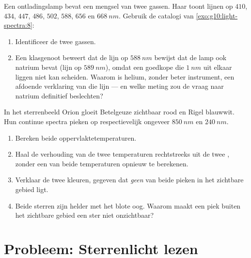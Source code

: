\begin{exercise}[$\star\star\star$]\label{exo:g10:light-spectra:14}
Een ontladingslamp bevat een mengsel van twee gassen. Haar  toont
lijnen op $410$, $434$, $447$, $486$, $502$, $588$, $656$ en
$\qty{668}{nm}$. Gebruik de catalogi van \cref{exo:g10:light-spectra:8}:
\begin{enumerate}
  \item Identificeer de twee gassen.
  \item Een klasgenoot beweert dat de lijn op $\qty{588}{nm}$ bewijst dat
        de lamp ook natrium bevat (lijn op $\qty{589}{nm}$), omdat een
        goedkope   die $\qty{1}{nm}$ uit elkaar
        liggen niet kan scheiden. Waarom is helium, zonder beter
        instrument, een afdoende verklaring van die lijn --- en welke
        meting zou de vraag naar natrium definitief beslechten?
\end{enumerate}
\end{exercise}

\begin{exercise}[$\star\star\star$]\label{exo:g10:light-spectra:15}
In het sterrenbeeld Orion gloeit Betelgeuze zichtbaar rood en Rigel
blauwwit. Hun continue spectra pieken op respectievelijk ongeveer
$\qty{850}{nm}$ en $\qty{240}{nm}$.
\begin{enumerate}
  \item Bereken beide oppervlaktetemperaturen.
  \item Haal de verhouding van de twee temperaturen rechtstreeks uit de
        twee , zonder een van beide temperaturen opnieuw te
        berekenen.
  \item Verklaar de twee kleuren, gegeven dat \emph{geen} van beide
        pieken in het zichtbare gebied ligt.
  \item Beide sterren zijn helder met het blote oog. Waarom maakt een
        piek buiten het zichtbare gebied een ster niet onzichtbaar?
\end{enumerate}
\end{exercise}

\section{Probleem: Sterrenlicht lezen}

